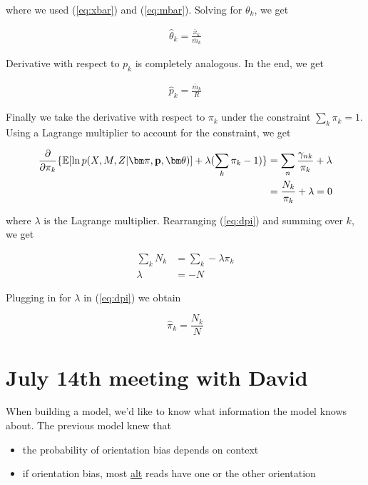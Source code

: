 \documentclass[a4paper]{article}
\newcommand{\vp}{{\bf p}}
\newcommand{\vpi}{{\bm \pi}}
\newcommand{\vtheta}{{\bm \theta}}
\newcommand{\E}{\mathbb{E}}
\begin{document}
where we used (\ref{eq:xbar}) and (\ref{eq:mbar}). Solving for $\theta_k$, we get

\begin{align}
\hat{\theta}_k = \frac{\bar{x}_k}{\bar{m}_k} \label{eq:theta}
\end{align}

Derivative with respect to $p_k$ is completely analogous. In the end, we get

\begin{align}
\hat{p}_k = \frac{\bar{m}_k}{R} \label{eq:p}
\end{align}

Finally we take the derivative with respect to $\pi_k$ under the constraint $\sum_k \pi_k = 1$. Using a Lagrange multiplier to account for the constraint, we get

\begin{align}
\frac{\partial}{\partial \pi_k} \{ \E [ \ln p(X, M , Z | \vpi, \vp, \vtheta) ] + \lambda ( \sum_k \pi_k - 1)\} &= \sum_n \frac{\gamma_{nk}}{\pi_k} + \lambda \nonumber \\
																   &= \frac{N_k}{\pi_k} + \lambda = 0 \label{eq:dpi}
\end{align}

where $\lambda$ is the Lagrange multiplier. Rearranging (\ref{eq:dpi}) and summing over $k$, we get

\begin{align*}
\sum_k N_k &= \sum_k - \lambda \pi_k \\
      \lambda &= - N 
\end{align*}

Plugging in for $\lambda$ in (\ref{eq:dpi}) we obtain

\begin{equation}
\hat{\pi}_k = \frac{N_k}{N}
\end{equation}




\section{July 14th meeting with David}

When building a model, we'd like to know what information the model knows about. The previous model knew that 

\begin{itemize}
\item the probability of orientation bias depends on context
\item if orientation bias, most \underline{alt} reads have one or the other orientation
\end{itemize}
\end{document}
